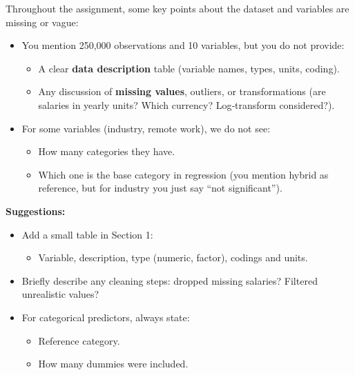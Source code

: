 \documentclass[
  letterpaper,
  DIV=11,
  numbers=noendperiod]{scrartcl}
\providecommand{\tightlist}{%
  \setlength{\itemsep}{0pt}\setlength{\parskip}{0pt}}
\begin{document}
Throughout the assignment, some key points about the dataset and
variables are missing or vague:

\begin{itemize}
\tightlist
\item
  You mention 250,000 observations and 10 variables, but you do not
  provide:

  \begin{itemize}
  \tightlist
  \item
    A clear \textbf{data description} table (variable names, types,
    units, coding).\\
  \item
    Any discussion of \textbf{missing values}, outliers, or
    transformations (are salaries in yearly units? Which currency?
    Log‑transform considered?).\\
  \end{itemize}
\item
  For some variables (industry, remote work), we do not see:

  \begin{itemize}
  \tightlist
  \item
    How many categories they have.
  \item
    Which one is the base category in regression (you mention hybrid as
    reference, but for industry you just say ``not significant'').
  \end{itemize}
\end{itemize}

\textbf{Suggestions:}

\begin{itemize}
\tightlist
\item
  Add a small table in Section 1:

  \begin{itemize}
  \tightlist
  \item
    Variable, description, type (numeric, factor), codings and units.\\
  \end{itemize}
\item
  Briefly describe any cleaning steps: dropped missing salaries?
  Filtered unrealistic values?\\
\item
  For categorical predictors, always state:

  \begin{itemize}
  \tightlist
  \item
    Reference category.
  \item
    How many dummies were included.
  \end{itemize}
\end{itemize}
\end{document}
